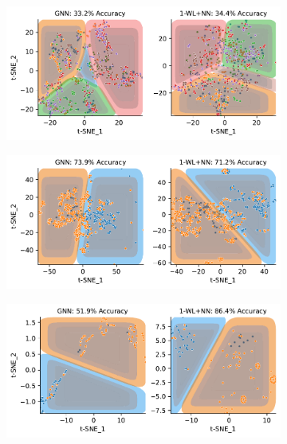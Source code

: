 \begin{figure}[!htb]
	\begin{subfigure}[b]{0.49\textwidth}
		\centering
		\includegraphics[width=\textwidth]{Figures/tsne_svm_lin_ENZYMES.pdf}
		\vspace*{-4ex} 
		\caption{\enzymes}
	\end{subfigure}
	\hfill
	\begin{subfigure}[b]{0.49\textwidth}
		\centering
		\includegraphics[width=\textwidth]{Figures/tsne_svm_lin_IMDB.pdf}
		\vspace*{-4ex} 
		\caption{\imdb}
	\end{subfigure}
	\par\bigskip
	\begin{subfigure}[b]{0.49\textwidth}
		\centering
		\includegraphics[width=\textwidth]{Figures/tsne_svm_lin_MUTAG.pdf}

\end{subfigure}
\end{figure}
